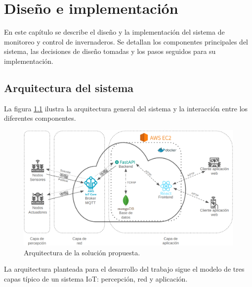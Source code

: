
\chapter{Diseño e implementación} %

\label{Chapter3} %

En este capítulo se describe el diseño y la implementación del sistema de
monitoreo y control de invernaderos. Se detallan los componentes principales
del sistema, las decisiones de diseño tomadas y los pasos seguidos para su
implementación.

\section{Arquitectura del sistema}

La figura \ref{fig:arquitectura} ilustra la arquitectura general del sistema y
la interacción entre los diferentes componentes.

\begin{figure}[H]
    \centering
    \includegraphics[width=.99\textwidth]{./Images/14.png}
    \caption{Arquitectura de la solución propuesta.}
    \label{fig:arquitectura}
\end{figure}

La arquitectura planteada para el desarrollo del trabajo sigue el modelo de
tres capas típico de un sistema IoT: percepción, red y aplicación.

